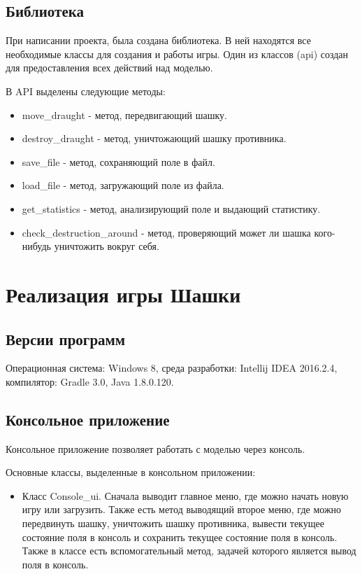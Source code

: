 \documentclass[a4paper]{article}
\begin{document}
\subsection{Библиотека}
При написании проекта, была создана библиотека. В ней находятся все необходимые классы для создания и работы игры. Один из классов (api) создан для предоставления всех действий над моделью.

\noindent В API выделены следующие методы: 
\begin{itemize}
\item move\_draught - метод, передвигающий шашку.
\item destroy\_draught - метод, уничтожающий шашку противника.
\item save\_file - метод, сохраняющий поле в файл.
\item load\_file - метод, загружающий поле из файла.
\item get\_statistics - метод, анализирующий поле и выдающий статистику.
\item check\_destruction\_around - метод, проверяющий может ли шашка кого-нибудь уничтожить вокруг себя.
\end{itemize}


\section{Реализация игры Шашки}
\subsection{Версии программ}
Операционная система: Windows 8, среда разработки: Intellij IDEA 2016.2.4, компилятор: Gradle 3.0, Java 1.8.0.120.

\subsection{Консольное приложение}
Консольное приложение позволяет работать с моделью через консоль.

\noindent Основные классы, выделенные в консольном приложении:
\begin{itemize}
\item Класс Console\_ui. Сначала выводит главное меню, где можно начать новую игру или загрузить. Также есть метод выводящий второе меню, где можно передвинуть шашку, уничтожить шашку противника, вывести текущее состояние поля в консоль и сохранить текущее состояние поля в консоль. Также в классе есть вспомогательный метод, задачей которого является вывод поля в консоль.
\end{itemize}
\end{document}
